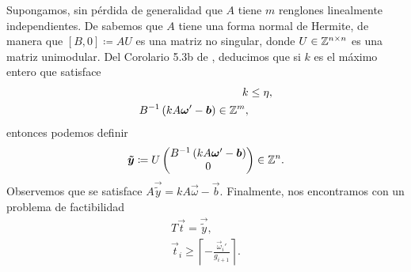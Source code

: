 Supongamos, sin pérdida de generalidad que $A$ tiene $m$ renglones linealmente independientes. De
\cite{alex} sabemos que $A$ tiene una forma normal de Hermite, de manera que $[B, 0] \coloneq AU$ es una
matriz no singular, donde $U \in \mathbb{Z}^{n \times n}$ es una matriz unimodular. Del Corolario 5.3b de
\cite{alex}, deducimos que si $k$ es el máximo entero que satisface
\begin{align}
	k &\leq \eta, \\
	B^{-1}\left(k A\boldsymbol{\omega}' - \boldsymbol{b}\right) \in \mathbb{Z}^m,
\end{align}
entonces podemos definir
\begin{equation}
	\boldsymbol{\tilde{y}} \coloneq U\begin{pmatrix}
		B^{-1}\left(kA\boldsymbol{\omega}' - \boldsymbol{b}\right)
		\\ 0
	\end{pmatrix} \in \mathbb{Z}^n.
\end{equation}
Observemos que se satisface $A\vec{\tilde{y}} = kA\vec{\omega} - \vec{b}$. Finalmente, nos
encontramos con un problema de factibilidad
\begin{align*}
	T\vec{t} = \vec{\tilde{y}}, \\
	\vec{t}_i \geq \left\lceil -\frac{\vec{\omega}_i'}{g_{i + 1}} \right\rceil.
\end{align*}
